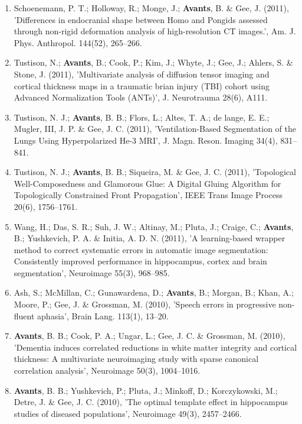 \documentclass[11pt]{moderncv} %
\begin{document}
\begin{enumerate}
\item  Schoenemann, P. T.; Holloway, R.; Monge, J.; \textbf{Avants}, B. \&  Gee, J. (2011), 'Differences in endocranial shape between Homo and Pongids assessed through non-rigid deformation analysis of high-resolution CT images.', Am. J. Phys. Anthropol. 144(52), 265--266.

\item  Tustison, N.; \textbf{Avants}, B.; Cook, P.; Kim, J.; Whyte, J.; Gee, J.; Ahlers, S. \&  Stone, J. (2011), 'Multivariate analysis of diffusion tensor imaging and cortical thickness maps in a traumatic brian injury (TBI) cohort using Advanced Normalization Tools (ANTs)', J. Neurotrauma 28(6), A111.

\item  Tustison, N. J.; \textbf{Avants}, B. B.; Flors, L.; Altes, T. A.; de lange, E. E.; Mugler, III, J. P. \&  Gee, J. C. (2011), 'Ventilation-Based Segmentation of the Lungs Using Hyperpolarized He-3 MRI', J. Magn. Reson. Imaging 34(4), 831--841.

\item  Tustison, N. J.; \textbf{Avants}, B. B.; Siqueira, M. \&  Gee, J. C. (2011), 'Topological Well-Composedness and Glamorous Glue: A Digital Gluing Algorithm for Topologically Constrained Front Propagation', IEEE Trans Image Process 20(6), 1756--1761.

\item  Wang, H.; Das, S. R.; Suh, J. W.; Altinay, M.; Pluta, J.; Craige, C.; \textbf{Avants}, B.; Yushkevich, P. A. \&  Initia, A. D. N. (2011), 'A learning-based wrapper method to correct systematic errors in automatic image segmentation: Consistently improved performance in hippocampus, cortex and brain segmentation', Neuroimage 55(3), 968--985.

\item  Ash, S.; McMillan, C.; Gunawardena, D.; \textbf{Avants}, B.; Morgan, B.; Khan, A.; Moore, P.; Gee, J. \&  Grossman, M. (2010), 'Speech errors in progressive non-fluent aphasia', Brain Lang. 113(1), 13--20.

\item  \textbf{Avants}, B. B.; Cook, P. A.; Ungar, L.; Gee, J. C. \&  Grossman, M. (2010), 'Dementia induces correlated reductions in white matter integrity and cortical thickness: A multivariate neuroimaging study with sparse canonical correlation analysis', Neuroimage 50(3), 1004--1016.

\item  \textbf{Avants}, B. B.; Yushkevich, P.; Pluta, J.; Minkoff, D.; Korczykowski, M.; Detre, J. \&  Gee, J. C. (2010), 'The optimal template effect in hippocampus studies of diseased populations', Neuroimage 49(3), 2457--2466.


\end{enumerate}
\end{document}
